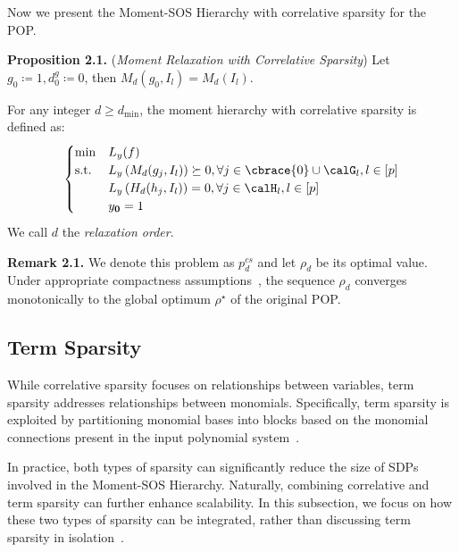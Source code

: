Now we present the Moment-SOS Hierarchy with correlative sparsity for the POP.

\textbf{Proposition 2.1.} (\emph{Moment Relaxation with Correlative Sparsity}) Let  $g_0 \coloneqq 1, d_0^g \coloneqq 0$, then $M_d(g_0, I_l) = M_d(I_l)$.

For any integer $d \geq d_{\min}$, the moment hierarchy with correlative sparsity is defined as:
\begin{align}
	\begin{cases}
		\min & L_y(f) \\
		\text{s.t.} & L_y\left( M_d(g_j, I_l) \right) \succeq 0, \forall j\in \cbrace{0} \cup \calG_l, l\in [p]\\
		& L_y\left( H_d(h_j, I_l) \right) = 0, \forall j\in \calH_l, l\in [p]\\
		& y_{\mathbf{0}} = 1 
	\end{cases}
\end{align}
We call $d$ the \emph{relaxation order}.

\textbf{Remark 2.1.} We denote this problem as $p_d^{cs}$ and let $\rho_d$ be its optimal value. Under appropriate compactness assumptions~\cite{Lasserre2006siam-convergent-sdp-relaxation}, the sequence ${\rho_d}$ converges monotonically to the global optimum $\rho^\star$ of the original POP.


\subsection{Term Sparsity}
While correlative sparsity focuses on relationships between variables, term sparsity addresses relationships between monomials. Specifically, term sparsity is exploited by partitioning monomial bases into blocks based on the monomial connections present in the input polynomial system~\cite{wang2021siam-tssos}.

In practice, both types of sparsity can significantly reduce the size of SDPs involved in the Moment-SOS Hierarchy. Naturally, combining correlative and term sparsity can further enhance scalability. In this subsection, we focus on how these two types of sparsity can be integrated, rather than discussing term sparsity in isolation~\cite{wang2022tms-cs-tssos}.

